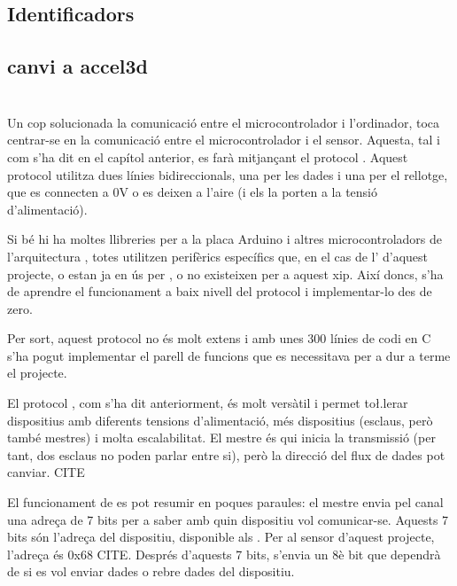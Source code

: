 \subsection{Identificadors }
\subsection{}

\subsection{canvi a accel3d}

\section{}

Un cop solucionada la comunicació entre el microcontrolador i l'ordinador, toca
centrar-se en la comunicació entre el microcontrolador i el sensor. Aquesta, tal
i com s'ha dit en el capítol anterior, es farà mitjançant el protocol .
Aquest protocol utilitza dues línies bidireccionals, una per les dades i una per
el rellotge, que es connecten a 0V o es deixen a l'aire (i els  la
porten a la tensió d'alimentació).

Si bé hi ha moltes llibreries per a la placa Arduino i altres microcontroladors
de l'arquitectura , totes utilitzen perifèrics específics que, en el
cas de l' d'aquest projecte, o estan ja en ús per , o
no existeixen per a aquest xip. Així doncs, s'ha de aprendre el funcionament a
baix nivell del protocol i implementar-lo des de zero.

Per sort, aquest protocol no és molt extens i amb unes 300 línies de codi en C
s'ha pogut implementar el parell de funcions que es necessitava per a dur a
terme el projecte.

El protocol , com s'ha dit anteriorment, és molt versàtil i permet 
to\l.lerar dispositius amb diferents tensions d'alimentació, més dispositius
(esclaus, però també mestres) i molta escalabilitat. El mestre és qui inicia
la transmissió (per tant, dos esclaus no poden parlar entre si), però la
direcció del flux de dades pot canviar. CITE

El funcionament de  es pot resumir en poques paraules: el mestre envia
pel canal una adreça de 7 bits per a saber amb quin dispositiu vol comunicar-se.
Aquests 7 bits són l'adreça del dispositiu, disponible als . Per
al sensor d'aquest projecte, l'adreça és 0x68 CITE. Després d'aquests 7 bits,
s'envia un 8è bit que dependrà de si es vol enviar dades o rebre dades del
dispositiu.

